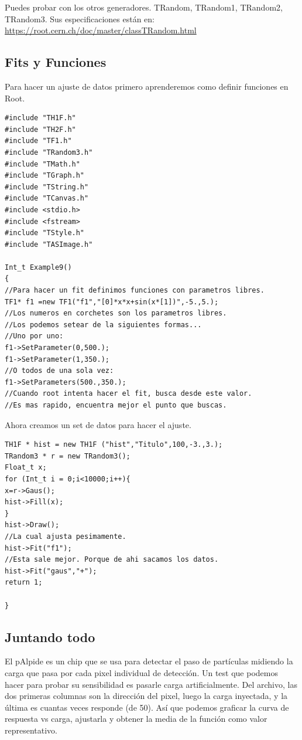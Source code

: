 \documentclass{article}
\begin{document}
Puedes probar con los otros generadores. TRandom, TRandom1, TRandom2, TRandom3. Sus especificaciones est\'an en: \url{https://root.cern.ch/doc/master/classTRandom.html}

\subsection{Fits y Funciones}

Para hacer un ajuste de datos primero aprenderemos como definir funciones en Root.

\begin{tcolorbox} [breakable]
\begin{verbatim}
#include "TH1F.h"
#include "TH2F.h"
#include "TF1.h"
#include "TRandom3.h"
#include "TMath.h"
#include "TGraph.h"
#include "TString.h"
#include "TCanvas.h"
#include <stdio.h>
#include <fstream>
#include "TStyle.h"
#include "TASImage.h"

Int_t Example9()
{
//Para hacer un fit definimos funciones con parametros libres.
TF1* f1 =new TF1("f1","[0]*x*x+sin(x*[1])",-5.,5.);
//Los numeros en corchetes son los parametros libres.
//Los podemos setear de la siguientes formas...
//Uno por uno:
f1->SetParameter(0,500.);
f1->SetParameter(1,350.);
//O todos de una sola vez:
f1->SetParameters(500.,350.);
//Cuando root intenta hacer el fit, busca desde este valor.
//Es mas rapido, encuentra mejor el punto que buscas.
\end{verbatim}
\end{tcolorbox}

Ahora creamos un set de datos para hacer el ajuste.
\begin{tcolorbox} [breakable]
\begin{verbatim}
TH1F * hist = new TH1F ("hist","Titulo",100,-3.,3.);
TRandom3 * r = new TRandom3();
Float_t x;
for (Int_t i = 0;i<10000;i++){
x=r->Gaus();
hist->Fill(x);
}
hist->Draw();
//La cual ajusta pesimamente.
hist->Fit("f1");
//Esta sale mejor. Porque de ahi sacamos los datos.
hist->Fit("gaus","+");
return 1;

}
\end{verbatim}
\end{tcolorbox}

\subsection{Juntando todo}

El pAlpide es un chip que se usa para detectar el paso de part\'iculas midiendo la carga que pasa por cada pixel individual de detecci\'on. Un test que podemos hacer para probar su sensibilidad es pasarle carga artificialmente. Del archivo, las dos primeras columnas son la direcci\'on del pixel, luego la carga inyectada, y la \'ultima es cuantas veces responde (de 50). As\'i que podemos graficar la curva de respuesta vs carga, ajustarla y obtener la media de la funci\'on como valor representativo.
\end{document}
